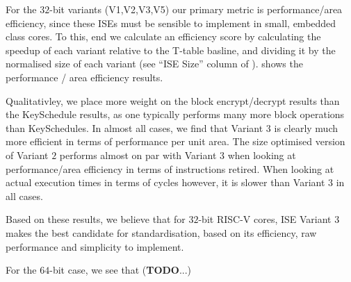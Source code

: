 For the $32$-bit variants (V1,V2,V3,V5) our primary metric is
performance/area efficiency, since these ISEs must be sensible to
implement in small, embedded class cores.
To this, end we calculate an efficiency score by calculating the speedup
of each variant relative to the T-table basline, and dividing it
by the normalised size of each variant
(see ``ISE Size'' column of ).
 shows the performance / area efficiency results.

Qualitativley, we place more weight on the block encrypt/decrypt results
than the KeySchedule results, as one typically performs many more
block operations than KeySchedules.
In almost all cases, we find that Variant $3$ is clearly much more
efficient in terms of performance per unit area.
The size optimised version of Variant $2$ performs almost on par with
Variant $3$ when looking at performance/area efficiency in terms of
instructions retired.
When looking at actual execution times in terms of cycles however,
it is slower than Variant $3$ in all cases.

Based on these results, we believe that for $32$-bit RISC-V cores,
ISE Variant $3$ makes the best candidate for standardisation,
based on its efficiency, raw performance and simplicity to implement.

For the $64$-bit case, we see that ({\bf TODO}...)
